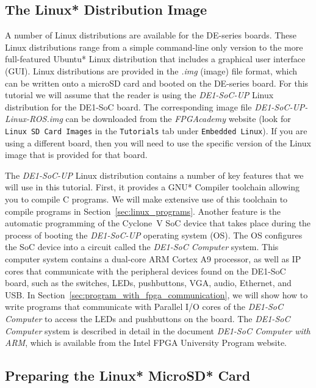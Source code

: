 \documentclass[11pt, twoside, pdftex]{article}
\begin{document}
\subsection{The Linux* Distribution Image}

A number of Linux distributions are available for the DE-series boards. These Linux distributions 
range from a simple command-line only version to the more full-featured Ubuntu* Linux 
distribution that includes a graphical user interface (GUI). Linux distributions are provided 
in the \textit{.img} (image) file format, which can be written onto a microSD card and booted 
on the DE-series board. For this tutorial we will assume that the reader is using the 
\textit{DE1-SoC-UP} Linux distribution for the DE1-SoC board. The corresponding image 
file \textit{DE1-SoC-UP-Linux-ROS.img} can be downloaded from the {\it FPGAcademy} website 
(look for \texttt{Linux SD Card Images} in the \texttt{Tutorials} 
tab under \texttt{Embedded Linux}).
If you are using a different board, then you will need to use the specific version of the 
Linux image that is provided for that board.

The \textit{DE1-SoC-UP} Linux distribution contains a number of key features that we will use 
in this tutorial. First, it provides a GNU* Compiler toolchain allowing you to compile C programs.
We will make extensive use of this toolchain to compile programs in 
Section~\ref{sec:linux_programs}. Another feature is the automatic programming of the Cyclone~V SoC
device that takes place during the process of booting the \textit{DE1-SoC-UP} operating system
(OS). The OS configures the SoC device into a circuit called the \textit{DE1-SoC Computer} system.
This computer system contains a dual-core ARM Cortex A9 processor, as well as IP cores that 
communicate with the peripheral devices found on the DE1-SoC board, such as the switches, 
LEDs, pushbuttons, VGA, audio, Ethernet, and USB. In 
Section~\ref{sec:program_with_fpga_communication}, we will 
show how to write programs that communicate with Parallel I/O cores of the 
\textit{DE1-SoC Computer} to access the LEDs and pushbuttons on the board. 
The \textit{DE1-SoC Computer} system is described in detail in the document 
\textit{DE1-SoC Computer with ARM}, which is available from the Intel FPGA University
Program website.

\subsection{Preparing the Linux* MicroSD* Card}
\end{document}
